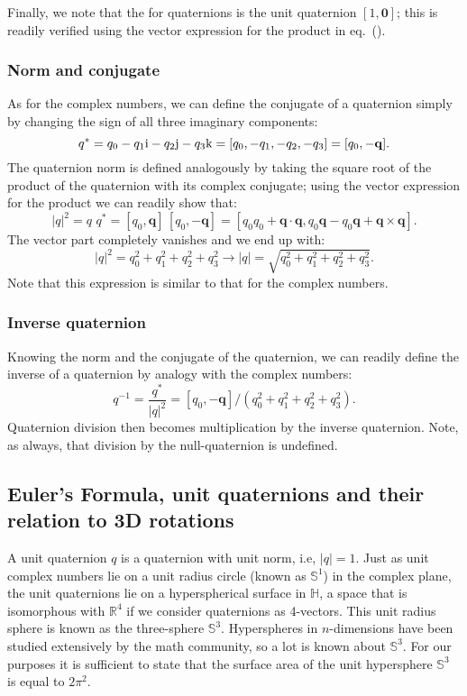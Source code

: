 Finally, we note that the  for quaternions is the unit quaternion $[1,\mathbf{0}]$; this is readily verified using the vector expression for the product in eq.~().

\subsubsection{Norm and conjugate}
As for the complex numbers, we can define the conjugate of a quaternion simply by changing the sign of all three imaginary components:
\begin{equation}
	q^{\ast} = q_0 -q_1\mathrm{i}-q_2\mathrm{j}-q_3\mathrm{k}= [q_0,-q_1,-q_2,-q_3] = [q_0,-\mathbf{q}].
\end{equation}
The quaternion norm is defined analogously by taking the square root of the product of the quaternion with its complex conjugate; using the vector expression for the product we can readily show that:
\begin{equation}
	\vert q\vert^2 = q\,\,q^{\ast} = [q_0,\mathbf{q}]\,[q_0,-\mathbf{q}] = [ q_0q_0+\mathbf{q}\cdot\mathbf{q}, q_0\mathbf{q}-q_0\mathbf{q}+\mathbf{q}\times\mathbf{q} ].
\end{equation}
The vector part completely vanishes and we end up with:
\begin{equation}
	\vert q\vert^2 = q_0^2+q_1^2+q_2^2+q_3^2\rightarrow \vert q\vert = \sqrt{q_0^2+q_1^2+q_2^2+q_3^2}.
\end{equation}
Note that this expression is similar to that for the complex numbers.

\subsubsection{Inverse quaternion}
Knowing the norm and the conjugate of the quaternion, we can readily define the inverse of a quaternion by analogy with the complex numbers:
\begin{equation}
	q^{-1} = \frac{q^{\ast}}{\vert q\vert^2} = [q_0,-\mathbf{q}] / (q_0^2+q_1^2+q_2^2+q_3^2).
\end{equation}
Quaternion division then becomes multiplication by the inverse quaternion.  Note, as always, that division by the null-quaternion is undefined.

\subsection{Euler's Formula, unit quaternions and their relation to 3D rotations}
A unit quaternion $q$ is a quaternion with unit norm, i.e, $\vert q\vert=1$.  Just as unit complex numbers lie on a unit radius circle (known as $\mathbb{S}^1$) in the complex plane, the unit quaternions lie on a hyperspherical surface in $\mathbb{H}$, a space that is isomorphous with $\mathbb{R}^4$ if we consider quaternions as 4-vectors. This unit radius sphere is known as the three-sphere $\mathbb{S}^3$.  Hyperspheres in $n$-dimensions have been studied extensively by the math community, so a lot is known about $\mathbb{S}^3$.  For our purposes it is sufficient to state that the surface area of the unit hypersphere $\mathbb{S}^3$ is equal to $2\pi^2$.

